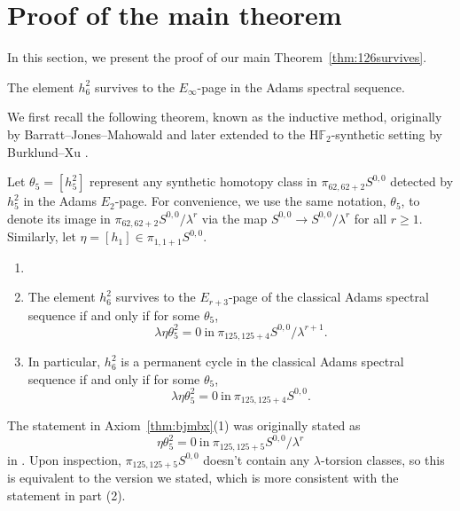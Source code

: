 \section{Proof of the main theorem}\label{sec:proof}

In this section, we present the proof of our main Theorem~\ref{thm:126survives}.

\begin{theorem} \label{thm:126survives}
    The element $h_6^2$ survives to the $E_\infty$-page in the Adams spectral sequence.
\end{theorem}

We first recall the following theorem, known as the inductive method, originally by Barratt--Jones--Mahowald \cite{BJMinduction} and later extended to the H$\mathbb{F}_2$-synthetic setting by Burklund--Xu \cite[Proposition~7.19]{BurklundXu}.

\begin{notation}
    Let $\theta_5 = [h_5^2]$ represent any synthetic homotopy class in $\pi_{62,62+2}S^{0,0}$ detected by $h_5^2$ in the Adams $E_2$-page. For convenience, we use the same notation, $\theta_5$, to denote its image in $\pi_{62,62+2}S^{0,0}/\lambda^r$ via the map $S^{0,0} \rightarrow S^{0,0}/\lambda^r$ for all $r \ge 1$. Similarly, let $\eta = [h_1] \in \pi_{1,1+1}S^{0,0}$.
\end{notation}


\begin{axiom} \label{thm:bjmbx}
\begin{enumerate}
 \item[]
 \item    The element $h_6^2$ survives to the $E_{r+3}$-page of the classical Adams spectral sequence if and only if for some $\theta_5$, 
 $$\lambda \eta \theta_5^2 = 0 \ \text{in} \ \pi_{125,125+4} S^{0,0}/\lambda^{r+1}.$$
 \item   In particular, $h_6^2$ is a permanent cycle in the classical Adams spectral sequence if and only if for some $\theta_5$,
 $$\lambda \eta \theta_5^2 = 0 \ \text{in} \ \pi_{125,125+4} S^{0,0}.$$ 
 \end{enumerate}
\end{axiom}

\begin{remark}
    The statement in Axiom~\ref{thm:bjmbx}(1) was originally stated as 
    $$\eta \theta_5^2 = 0 \ \text{in} \ \pi_{125,125+5} S^{0,0}/\lambda^r$$
    in \cite[Proposition~7.19]{BurklundXu}. Upon inspection, $\pi_{125,125+5} S^{0,0}$ doesn't contain any $\lambda$-torsion classes, so this is equivalent to the version we stated, which is more consistent with the statement in part (2). 
\end{remark}

